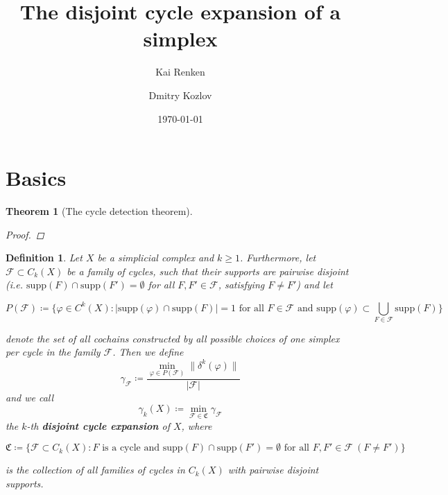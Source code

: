 \documentclass{article}
\title{The disjoint cycle expansion of a simplex}
\author{Kai Renken \and Dmitry Kozlov}
\date{\today}
\newcommand{\supp}{\mathrm{supp}}
\newtheorem{defi}{Definition}[section]
\newtheorem{thm}{Theorem}[section]
\begin{document}
\maketitle


\begin{abstract}

\end{abstract}

\section{Basics}

\begin{thm}[The cycle detection theorem]

\begin{proof}

\end{proof}
\end{thm}

\begin{defi}
Let \(X\) be a simplicial complex and \(k\geq 1\). Furthermore, let \(\mathcal{F}\subset C_k(X)\) be a family of cycles, such that their supports are pairwise disjoint (i.e. \(\supp(F)\cap\supp(F')=\emptyset\) for all \(F,F'\in\mathcal{F}\), satisfying \(F\neq F'\)) and let
\begin{small}
\[
P(\mathcal{F})\coloneqq\{\varphi\in C^k(X):|\supp(\varphi)\cap\supp(F)|=1\text{ for all }F\in\mathcal{F}\text{ and }\supp(\varphi)\subset\bigcup\limits_{F\in\mathcal{F}}\supp(F)\}
\]
\end{small}
denote the set of all cochains constructed by all possible choices of one simplex per cycle in the family \(\mathcal{F}\). Then we define
\[
\gamma_{\mathcal{F}}\coloneqq\frac{\min\limits_{\varphi\in P(\mathcal{F})}\|\delta^k(\varphi)\|}{|\mathcal{F}|}
\]
and we call
\[
\gamma_k(X)\coloneqq\min\limits_{\mathcal{F}\in\mathfrak{C}}\gamma_{\mathcal{F}}
\]
the \(k\)-th \textbf{disjoint cycle expansion} of \(X\), where
\begin{small}
\[
\mathfrak{C}\coloneqq\{\mathcal{F}\subset C_k(X):F\text{ is a cycle and }\supp(F)\cap\supp(F')=\emptyset\text{ for all }F,F'\in\mathcal{F}\:(F\neq F')\}
\]
\end{small}
is the collection of all families of cycles in \(C_k(X)\) with pairwise disjoint supports.
\end{defi}
\end{document}
